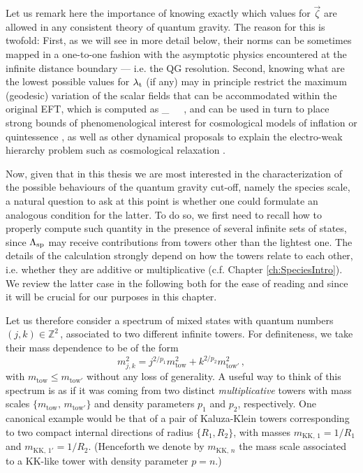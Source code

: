 Let us remark here the importance of knowing exactly which values for $\vec{\zeta}$ are allowed in any consistent theory of quantum gravity. The reason for this is twofold: First, as we will see in more detail below, their norms can be sometimes mapped in a one-to-one fashion with the asymptotic physics encountered at the infinite distance boundary --- i.e. the QG resolution. Second, knowing what are the lowest possible values for $\lambda_{\rm t}$ (if any) may in principle restrict the maximum (geodesic) variation of the scalar fields that can be accommodated within the original EFT, which is computed as
%
\beq
	\Delta_{\phi}\, \lesssim\, \, ,
\eeq
%
and can be used in turn to place strong bounds of phenomenological interest for cosmological models of inflation or quintessence \cite{Scalisi:2018eaz}, as well as other dynamical proposals to explain the electro-weak hierarchy problem such as cosmological relaxation \cite{Graham_2015}.

Now, given that in this thesis we are most interested in the characterization of the possible behaviours of the quantum gravity cut-off, namely the species scale, a natural question to ask at this point is whether one could formulate an analogous condition for the latter. To do so, we first need to recall how to properly compute such quantity in the presence of several infinite sets of states, since $\Lambda_{\text{sp}}$ may receive contributions from towers other than the lightest one. The details of the calculation strongly depend on how the towers relate to each other, i.e. whether they are additive or multiplicative (c.f. Chapter \ref{ch:SpeciesIntro}). We review the latter case in the following both for the ease of reading and since it will be crucial for our purposes in this chapter. 

Let us therefore consider a spectrum of mixed states with quantum numbers $(j, k) \in \mathbb{Z}^2\,$, associated to two different infinite towers. For definiteness, we take their mass dependence to be of the form
%
\begin{equation} \label{eq:massmultiplicativetowers}
  m_{j,k}^{2} = j^{2/p_1} m_{\text{tow}}^2 + k^{2/p_2} m_{\text{tow}'}^2 \, ,
\end{equation}
%
with $m_{\text{tow}}\leq m_{\text{tow}'}$ without any loss of generality. A useful way to think of this spectrum is as if it was coming from two distinct \emph{multiplicative} towers with mass scales $\{ m_{\text{tow}},\, m_{\text{tow}'} \}$ and density parameters $p_1$ and $p_2$, respectively. One canonical example would be that of a pair of Kaluza-Klein towers corresponding to two compact internal directions of radius $\{ R_1, R_2\}$, with masses $m_{\text{KK},\, 1}=1/R_1$ and $m_{\text{KK},\, 1'}=1/R_2$. (Henceforth we denote by $m_{\text{KK},\, n}$ the mass scale associated to a KK-like tower with density parameter $p=n$.)

